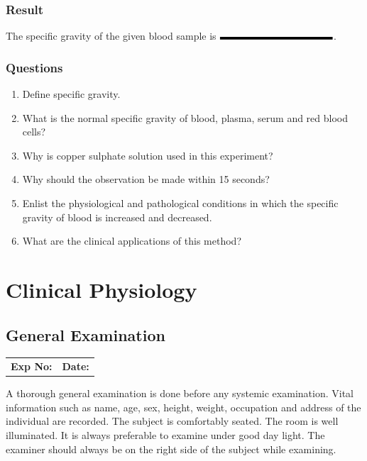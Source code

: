 \documentclass[a4paper,12pt]{book}
\begin{document}
															\section*{Result}
															The specific gravity of the given blood sample is $\rule{4cm}{.1cm}$.
															\section*{Questions}
															\begin{enumerate}
																\item{Define specific gravity.}
																\item{What is the normal specific gravity of blood, plasma, serum and red blood cells?}
																\item{Why is copper sulphate solution used in this experiment?}
																\item{Why should the observation be made within 15 seconds?}
																\item{Enlist the physiological and pathological conditions in which the specific gravity of blood is increased and decreased.}
																\item{What are the clinical applications of this method? }
															\end{enumerate}

															\part{Clinical Physiology}
															\chapter*{\centering General Examination}

															\begin{tabular}{p{5in} p{1in}}
																\textbf{Exp No:}  & \textbf{Date:}\\
															\end{tabular}
															A thorough general examination is done before any systemic examination. Vital information such as name, age, sex, height, weight, occupation and address of the individual are recorded. The subject is comfortably seated. The room is well illuminated. It is always preferable to examine under good day light. The examiner should always be on the right side of the subject while examining.
\end{document}
